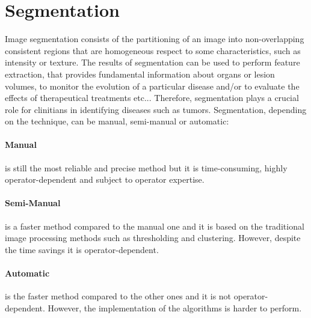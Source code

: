 \documentclass{standalone}
\begin{document}
\section{Segmentation}
Image segmentation consists of the partitioning of an image into non-overlapping consistent regions that are homogeneous respect to some characteristics, such as intensity or texture\cite{biondi}.
The results of segmentation can be used to perform feature extraction, that provides fundamental information about organs or lesion volumes, to monitor the evolution of a particular disease and/or to evaluate the effects of therapeutical treatments etc...
Therefore, segmentation plays a crucial role for clinitians in identifying diseases such as tumors.
Segmentation, depending on the technique, can be manual, semi-manual or automatic:

\paragraph{Manual} is still the most reliable and precise method but it is time-consuming, highly operator-dependent and subject to operator expertise\cite{tesicoppola}.

\paragraph{Semi-Manual} is a faster method compared to the manual one and it is based on the traditional image processing methods such as thresholding and clustering. However, despite the time savings it is operator-dependent\cite{tesicoppola}.

\paragraph{Automatic} is the faster method compared to the other ones and it is not operator-dependent. However, the implementation of the algorithms is harder to perform\cite{tesicoppola}. 
\end{document}
